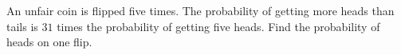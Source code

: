 An unfair coin is flipped five times. The probability of getting more heads than tails is $31$ times the probability of getting five heads. Find the probability of heads on one flip.
